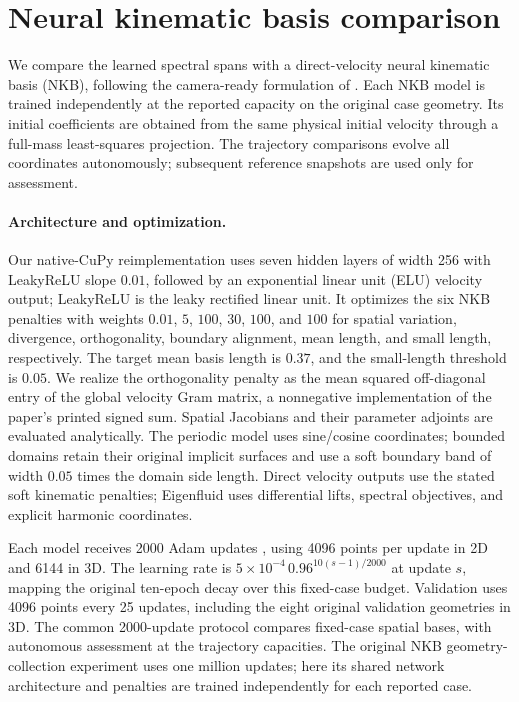 \section{Neural kinematic basis comparison}
\label{app:nkb}
We compare the learned spectral spans with a direct-velocity neural kinematic basis (NKB), following the camera-ready formulation of \citet{liu2025neural}. Each NKB model is trained independently at the reported capacity on the original case geometry. Its initial coefficients are obtained from the same physical initial velocity through a full-mass least-squares projection. The trajectory comparisons evolve all coordinates autonomously; subsequent reference snapshots are used only for assessment.

\paragraph{Architecture and optimization.}
Our native-CuPy reimplementation uses seven hidden layers of width 256 with LeakyReLU slope $0.01$, followed by an exponential linear unit (ELU) velocity output; LeakyReLU is the leaky rectified linear unit. It optimizes the six NKB penalties with weights $0.01$, $5$, $100$, $30$, $100$, and $100$ for spatial variation, divergence, orthogonality, boundary alignment, mean length, and small length, respectively. The target mean basis length is $0.37$, and the small-length threshold is $0.05$. We realize the orthogonality penalty as the mean squared off-diagonal entry of the global velocity Gram matrix, a nonnegative implementation of the paper's printed signed sum. Spatial Jacobians and their parameter adjoints are evaluated analytically. The periodic model uses sine/cosine coordinates; bounded domains retain their original implicit surfaces and use a soft boundary band of width $0.05$ times the domain side length. Direct velocity outputs use the stated soft kinematic penalties; Eigenfluid uses differential lifts, spectral objectives, and explicit harmonic coordinates.

Each model receives 2000 Adam updates {\citep{kingma2015adam}}, using 4096 points per update in 2D and 6144 in 3D. The learning rate is $5\times10^{-4}\,0.96^{10(s-1)/2000}$ at update $s$, mapping the original ten-epoch decay over this fixed-case budget. Validation uses 4096 points every 25 updates, including the eight original validation geometries in 3D. The common 2000-update protocol compares fixed-case spatial bases, with autonomous assessment at the trajectory capacities. The original NKB geometry-collection experiment uses one million updates; here its shared network architecture and penalties are trained independently for each reported case.

